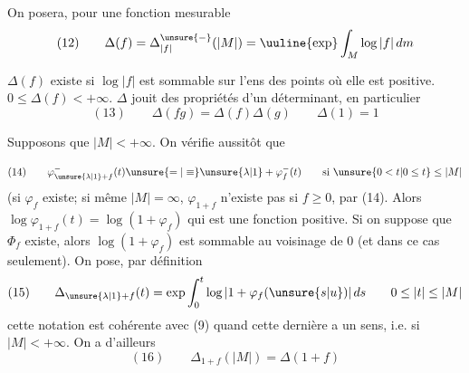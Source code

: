 
On posera, pour une fonction mesurable 
\[
(12)\qquad\Delta(f)=\Delta^{\unsure{-}}_{|f|}(|M|)=\uuline{\exp}\int_M\log|f|\,dm
\]
\par{}
\(\Delta(f)\) existe  si \(\log|f|\) est sommable sur l'ens des points où elle est positive. \(0\leq\Delta(f)<+\infty\).
\(\Delta\) jouit des propriétés d'un  déterminant, en particulier
\[
(13)\qquad\Delta(fg)=\Delta(f)\Delta(g)\qquad\Delta(1)=1
\]

Supposons que \(|M|<+\infty\). On vérifie aussitôt que  \par{}\par{}
\[
(14)\qquad\varphi^-_{\unsure{\lambda|1}+f}(t)\unsure{=|\equiv}\unsure{\lambda|1}+\varphi_f^-(t)\qquad\text{si }\unsure{0<t|0\leq t}\leq|M|
\]
(si \(\varphi_f\) existe; si même \(|M|=\infty\), \(\varphi_{1+f}\) n'existe pas  si \(f\geq0\),   par (14). Alors \(\log\varphi_{1+f}(t)=\log(1+\varphi_f)\) qui est une fonction positive. Si on suppose que \(\Phi_f\) existe, alors \(\log(1+\varphi_f)\) est sommable au voisinage de \(0\) (et dans ce cas seulement). On pose, par définition
\[
(15)\qquad\Delta_{\unsure{\lambda|1}+f}(t)=\exp\int_0^t\log|1+\varphi_f(\unsure{s|u})|\,ds
\qquad0\leq|t|\leq|M|
\]
cette notation est cohérente avec (9) quand cette dernière a un sens, i.e. si \(|M|<+\infty\). On a d'ailleurs
\[
(16)\qquad\Delta_{1+f}(|M|)=\Delta(1+f)
\]

